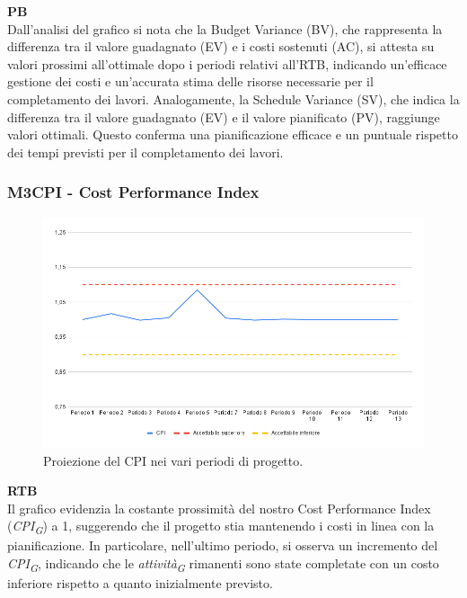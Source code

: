 \vspace{0.3cm}

\textbf{PB} \\
Dall'analisi del grafico si nota che la Budget Variance (BV), che rappresenta la differenza tra il valore guadagnato (EV) e i costi sostenuti (AC), si attesta su valori prossimi all'ottimale dopo i periodi relativi all'RTB, indicando un'efficace gestione dei costi e un'accurata stima delle risorse necessarie per il completamento dei lavori.
Analogamente, la Schedule Variance (SV), che indica la differenza tra il valore guadagnato (EV) e il valore pianificato (PV), raggiunge valori ottimali. Questo conferma una pianificazione efficace e un puntuale rispetto dei tempi previsti per il completamento dei lavori.

\subsubsection{M3CPI - Cost Performance Index}

\vspace{0.3cm}

\begin{figure}[H]
    \centering
    \includegraphics[width=1\textwidth]{../Images/PianoDiQualifica/M3CPI.png}
    \caption{Proiezione del CPI nei vari periodi di progetto.}
    \label{fig:6}
\end{figure}

\vspace{0.2cm}

\textbf{RTB} \\
Il grafico evidenzia la costante prossimità del nostro Cost Performance Index (\textit{CPI}\textsubscript{\textit{G}}) a 1, suggerendo che il progetto stia mantenendo i costi in linea con la pianificazione.
In particolare, nell'ultimo periodo, si osserva un incremento del \textit{CPI}\textsubscript{\textit{G}}, indicando che le \textit{attività}\textsubscript{\textit{G}} rimanenti sono state completate con un costo inferiore rispetto a quanto inizialmente previsto.

